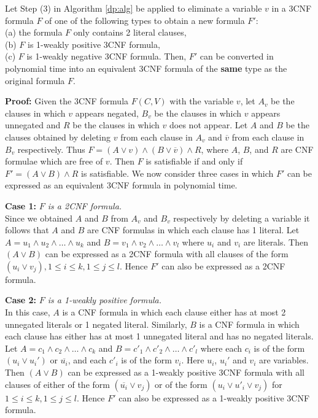 \newspacing


\begin{lemma}\label{le:putback}
Let Step (3) in Algorithm \ref{dp:alg} be applied to eliminate 
a variable $v$ in a  3CNF formula $F$ of one of the following types
to obtain a new formula $F'$: \\
(a) the formula $F$ only contains 2 literal clauses, \\
(b) $F$ is 1-weakly positive 3CNF formula, \\
(c) $F$ is 1-weakly negative 3CNF formula. 
Then, 
$F'$ can be converted in polynomial time 
into an equivalent 3CNF formula of the {\bf same} type as the original formula
$F$. 
\end{lemma}

\noindent
{\bf Proof:}
Given the {\sf 3CNF} formula $F(C,V)$ with the variable $v$, let
$A_v$ be  the clauses in which $v$ appears negated,
$B_v$ be the clauses in which $v$ appears unnegated and 
$R$ be  the clauses in which $v$ does not appear. Let $A$ and $B$  
be the clauses 
obtained by deleting $v$ from each clause in $A_v$ and 
$\overline{v}$ from each clause in $B_v$ respectively.
Thus $F=(A \vee v) \wedge (B \vee \overline{v}) \wedge R$, 
where $A$, $B$, and $R$ 
are CNF formulae which are free of $v$. 
Then $F$ is satisfiable if and only if 
$F'=(A \vee B) \wedge R$ is satisfiable.
We now consider three cases in which $F'$ can be expressed as an
equivalent 3CNF formula in polynomial time.

\noindent
{\bf Case 1:} {\em $F$ is a {\sf 2CNF} formula.}\\
Since we obtained $A$ and $B$ from $A_v$ and $B_v$ respectively by deleting 
a variable it follows that  $A$ and $B$ are {\sf CNF} formulas 
in which each clause has 1 literal.
Let $A= u_1 \wedge u_2 \wedge \ldots \wedge u_k$ and
$B=v_1 \wedge v_2 \wedge \ldots \wedge v_l$ where $u_i$ and $v_i$ are literals.
Then $(A \vee B)$ can be expressed as a {\sf 2CNF} formula with all clauses of
the form $(u_i \vee v_j),1 \leq i \leq k, 1 \leq j \leq l$. Hence
$F'$ can also be expressed as a {\sf 2CNF} formula.

\noindent
{\bf Case 2:}  {\em $F$ is a 1-weakly positive formula.}\\
In this case, $A$ is a {\sf CNF} formula in which each clause 
either has at most 2 unnegated literals or 1 negated literal.
Similarly, $B$ is a {\sf CNF} formula in which each clause has 
either has at most 1 unnegated literal and has no negated literals.
Let $A= c_1 \wedge c_2 \wedge \ldots \wedge c_k$ and
$B=c'_1 \wedge c'_2 \wedge \ldots \wedge c'_l$ where each
$c_i$ is of the form $(u_i \vee u_i')$ or $\overline{u_i}$, and each $c'_i$ is 
of the form $v_i$. Here $u_i$, $u_i'$ and $v_i$ are variables.
Then $(A \vee B)$ can be expressed as a 1-weakly positive {\sf 3CNF} 
formula with all clauses of
either of the form $(\overline{u_i} \vee v_j)$ or of the form
$(u_i \vee u'_i \vee v_j)$ for $1 \leq i \leq k, 1 \leq j \leq l$. Hence
$F'$ can also be expressed as a 1-weakly positive {\sf 3CNF} formula.\\

